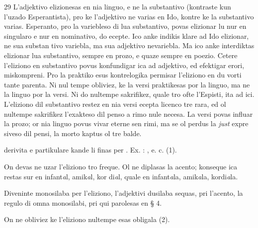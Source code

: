 \begin{VUpage}[33]{29}
{L'adjektivo elizionesas en nia linguo, e ne la substantivo (kontraste\nl
kun l'uzado Esperantista), pro ke l'adjektivo ne varias en Ido,\nl
kontre ke la substantivo varias. Esperanto, pro la variebleso di lua\nl
substantivo, povas elizionar lu nur en singularo e nur en nominativo,\nl
do ecepte. Ico anke indikis klare ad Ido elizionar, ne sua substan\cc
tivo variebla, ma sua adjektivo nevariebla. Ma ico anke interdiktas\nl
elizionar lua substantivo, sempre en prozo, e quaze sempre en\nl
poezio. Cetere l'eliziono en substantivo povus konfundigar ica ad\nl
adjektivo, ed efektigar erori, miskompreni. Pro la praktiko esus\nl
kontrelogika permisar l'eliziono en du vorti tante parenta. Ni nul\cc
tempe obliviez, ke la versi praktikesas por la linguo, ma ne la\nl
linguo por la versi. Ni do nultempe sakrifikez, quale tro ofte\nl
l'Espisti, ita ad ici. L'eliziono dil substantivo restez en nia versi\nl
ecepta licenco tre rara, ed ol nultempe sakrifikez l'exakteso dil\nl
penso a rimo nule necesa. La versi povas influar la prozo; or nia\nl
linguo povus vivar eterne sen rimi, ma se ol perdus la \textit{just} expre\cc
siveso dil pensi, la morto kaptus ol tre balde.%
}

\VUcontinue derivita e partikulare kande li finas per . Ex. :\nl
{}, e. c. (1).

On devas ne uzar l'eliziono tro freque. Ol ne diplasas la\nl
acento; konseque ica restas sur  en infant\textit{a}l, amik\textit{a}l, kor\cc
di\textit{a}l, quale en infant\textit{a}la, amik\textit{a}la, kordi\textit{a}la.

Diveninte monosilaba per l'eliziono, l'adjektivi dusilaba\nl
sequas, pri l'acento, la regulo di omna monosilabi, pri qui\nl
parolesas en § 4.

On ne obliviez ke l'eliziono nultempe esas obligala (2).
\end{VUpage}

